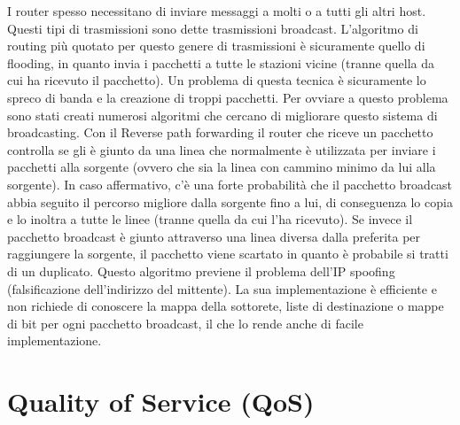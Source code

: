 I router spesso necessitano di inviare messaggi a molti o a tutti gli altri host. Questi tipi di trasmissioni sono dette trasmissioni broadcast.
L’algoritmo di routing più quotato per questo genere di trasmissioni è sicuramente quello di flooding, in quanto invia i pacchetti a tutte le stazioni vicine (tranne quella da cui ha ricevuto il pacchetto). Un problema di questa tecnica è sicuramente lo spreco di banda e la creazione di troppi pacchetti.
Per ovviare a questo problema sono stati creati numerosi algoritmi che cercano di migliorare questo sistema di broadcasting.
Con il Reverse path forwarding il router che riceve un pacchetto controlla se gli è giunto da una linea che normalmente è utilizzata per inviare i pacchetti alla sorgente (ovvero che sia la linea con cammino minimo da lui alla sorgente). In caso affermativo, c’è una forte probabilità che il pacchetto broadcast abbia seguito il percorso migliore dalla sorgente fino a lui, di conseguenza lo copia e lo inoltra a tutte le linee (tranne quella da cui l’ha ricevuto). Se invece il pacchetto broadcast è giunto attraverso una linea diversa dalla preferita per raggiungere la sorgente, il pacchetto viene scartato in quanto è probabile si tratti di un duplicato.
Questo algoritmo previene il problema dell’IP spoofing (falsificazione dell’indirizzo del mittente).
La sua implementazione è efficiente e non richiede di conoscere la mappa della sottorete, liste di destinazione o mappe di bit per ogni pacchetto broadcast, il che lo rende anche di facile implementazione.

\section{Quality of Service (QoS)}

